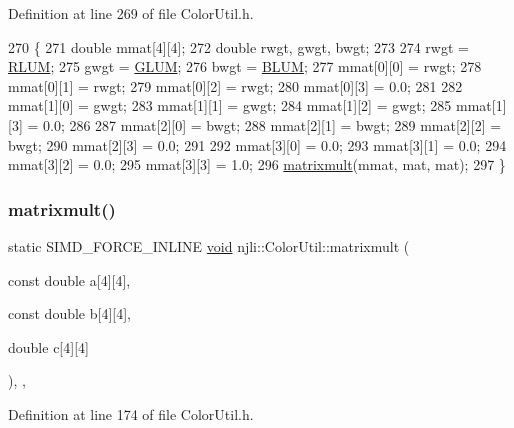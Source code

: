 Definition at line 269 of file Color\+Util.\+h.


\begin{DoxyCode}
270     \{
271       \textcolor{keywordtype}{double} mmat[4][4];
272       \textcolor{keywordtype}{double} rwgt, gwgt, bwgt;
273 
274       rwgt = \mbox{\hyperlink{_color_util_8h_a463792f2fa66c99a8329aae43be4c7fd}{RLUM}};
275       gwgt = \mbox{\hyperlink{_color_util_8h_a0faedcf9d84cbca5ee944af29148f6c1}{GLUM}};
276       bwgt = \mbox{\hyperlink{_color_util_8h_af5ec63b487cb34b43575bb5bf7589513}{BLUM}};
277       mmat[0][0] = rwgt;
278       mmat[0][1] = rwgt;
279       mmat[0][2] = rwgt;
280       mmat[0][3] = 0.0;
281 
282       mmat[1][0] = gwgt;
283       mmat[1][1] = gwgt;
284       mmat[1][2] = gwgt;
285       mmat[1][3] = 0.0;
286 
287       mmat[2][0] = bwgt;
288       mmat[2][1] = bwgt;
289       mmat[2][2] = bwgt;
290       mmat[2][3] = 0.0;
291 
292       mmat[3][0] = 0.0;
293       mmat[3][1] = 0.0;
294       mmat[3][2] = 0.0;
295       mmat[3][3] = 1.0;
296       \mbox{\hyperlink{classnjli_1_1_color_util_a5cb3576c8177f303c88dc4e7283367c7}{matrixmult}}(mmat, mat, mat);
297     \}
\end{DoxyCode}
\mbox{\label{classnjli_1_1_color_util_a5cb3576c8177f303c88dc4e7283367c7}} 
\subsubsection{\texorpdfstring{matrixmult()}{matrixmult()}}
{\footnotesize\ttfamily static S\+I\+M\+D\+\_\+\+F\+O\+R\+C\+E\+\_\+\+I\+N\+L\+I\+NE \mbox{\hyperlink{_thread_8h_af1e856da2e658414cb2456cb6f7ebc66}{void}} njli\+::\+Color\+Util\+::matrixmult (\begin{DoxyParamCaption}\item[{const double}]{a\mbox{[}4\mbox{]}\mbox{[}4\mbox{]},  }\item[{const double}]{b\mbox{[}4\mbox{]}\mbox{[}4\mbox{]},  }\item[{double}]{c\mbox{[}4\mbox{]}\mbox{[}4\mbox{]} }\end{DoxyParamCaption})\hspace{0.3cm}{\ttfamily [inline]}, {\ttfamily [static]}, {\ttfamily [protected]}}



Definition at line 174 of file Color\+Util.\+h.


